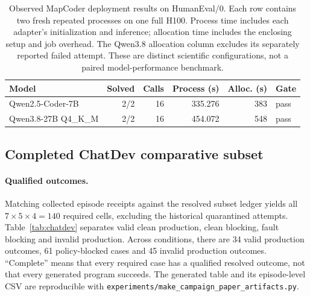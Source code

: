\documentclass[pdflatex,sn-mathphys-num]{sn-jnl}
\theoremstyle{thmstylethree}
\newcommand{\code}[1]{\texttt{#1}}
\begin{document}


\begin{table}[t]
\caption{Observed MapCoder deployment results on HumanEval/0. Each row contains two fresh repeated processes on one full H100. Process time includes each adapter's initialization and inference; allocation time includes the enclosing setup and job overhead. The Qwen3.8 allocation column excludes its separately reported failed attempt. These are distinct scientific configurations, not a paired model-performance benchmark.}\label{tab:mapcoder-models}
\small
\begin{tabularx}{\textwidth}{Yrrrrl}
\toprule Model & Solved & Calls & Process (s) & Alloc. (s) & Gate \\
\midrule
Qwen2.5-Coder-7B & 2/2 & 16 & 335.276 & 383 & pass \\
Qwen3.8-27B Q4\_K\_M & 2/2 & 16 & 454.072 & 548 & pass \\
\bottomrule
\end{tabularx}


\end{table}

\subsection{Completed ChatDev comparative subset}\label{sec:chatdev-results}
\paragraph{Qualified outcomes.} Matching collected episode receipts against the resolved subset ledger yields all $7\times5\times4=140$ required cells, excluding the historical quarantined attempts. Table~\ref{tab:chatdev} separates valid clean production, clean blocking, fault blocking and invalid production. Across conditions, there are 34 valid production outcomes, 61 policy-blocked cases and 45 invalid production outcomes. ``Complete'' means that every required case has a qualified resolved outcome, not that every generated program succeeds. The generated table and its episode-level CSV are reproducible with \code{experiments/make\_campaign\_paper\_artifacts.py}.
\end{document}
